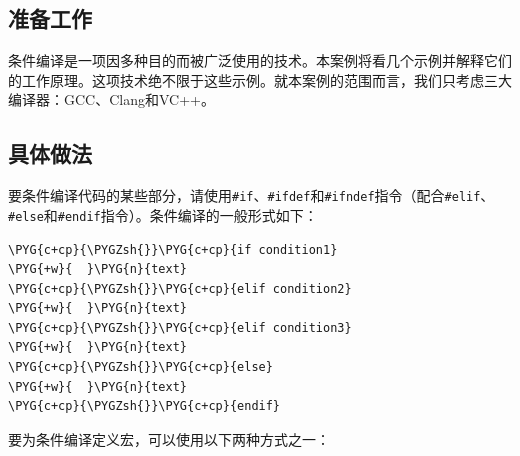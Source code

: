 
\subsection{准备工作}



条件编译是一项因多种目的而被广泛使用的技术。本案例将看几个示例并解释它们的工作原理。这项技术绝不限于这些示例。就本案例的范围而言，我们只考虑三大编译器：GCC、Clang和VC++。



\subsection{具体做法}



要条件编译代码的某些部分，请使用\texttt{\#if}、\texttt{\#ifdef}和\texttt{\#ifndef}指令（配合\texttt{\#elif}、\texttt{\#else}和\texttt{\#endif}指令）。条件编译的一般形式如下：



\begin{codeblockbg}
\begin{Verbatim}[commandchars=\\\{\},breaklines=true,breakanywhere=true,fontsize=\codefont,xleftmargin=17bp]
\PYG{c+cp}{\PYGZsh{}}\PYG{c+cp}{if condition1}
\PYG{+w}{  }\PYG{n}{text}
\PYG{c+cp}{\PYGZsh{}}\PYG{c+cp}{elif condition2}
\PYG{+w}{  }\PYG{n}{text}
\PYG{c+cp}{\PYGZsh{}}\PYG{c+cp}{elif condition3}
\PYG{+w}{  }\PYG{n}{text}
\PYG{c+cp}{\PYGZsh{}}\PYG{c+cp}{else}
\PYG{+w}{  }\PYG{n}{text}
\PYG{c+cp}{\PYGZsh{}}\PYG{c+cp}{endif}
\end{Verbatim}
\end{codeblockbg}



要为条件编译定义宏，可以使用以下两种方式之一：



